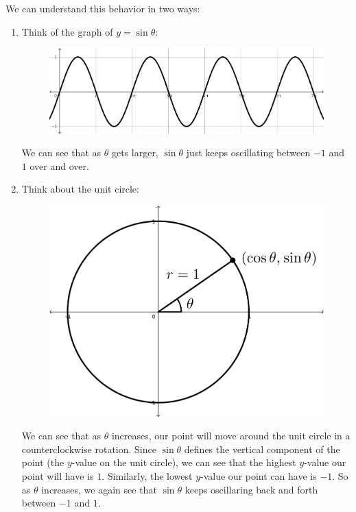 We can understand this behavior in two ways:
\begin{enumerate}
  \item Think of the graph of $y=\sin\theta$:
  \begin{figure}[h!tb]
    \includegraphics[scale=1]{./1_limits/images/1-1_graph6.png}
    \centering
  \end{figure}
  We can see that as $\theta$ gets larger, $\sin\theta$ just keeps oscillating between $-1$ and $1$ over and over.
  \item Think about the unit circle:
  \begin{figure}[h!tb]
    \includegraphics[scale=1]{./1_limits/images/unitcirc.png}
    \centering
  \end{figure}
  We can see that as $\theta$ increases, our point will move around the unit circle in a counterclockwise rotation.
  Since $\sin\theta$ defines the vertical component of the point (the $y$-value on the unit circle), we can see that the highest $y$-value our point will have is $1$.
  Similarly, the lowest $y$-value our point can have is $-1$.
  So as $\theta$ increases, we again see that $\sin\theta$ keeps oscillaring back and forth between $-1$ and $1$.
\end{enumerate}

